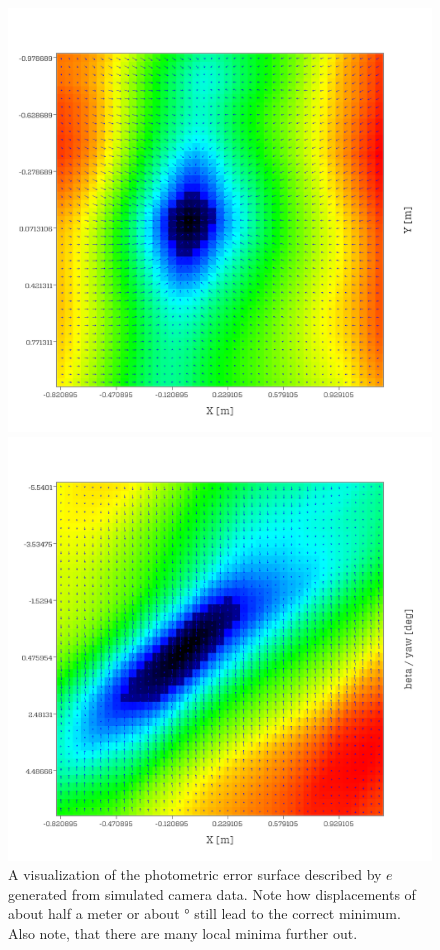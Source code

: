 \begin{figure}
\begin{minipage}[t]{0.48\textwidth}
    \end{minipage}
    \begin{minipage}[t]{0.48\textwidth}
        \includegraphics[width = \textwidth]{images/cost_surface/error_xy_1.png}
    \end{minipage}
    \hfill
    \begin{minipage}[t]{0.48\textwidth}
        \includegraphics[width = \textwidth]{images/cost_surface/error_xb_1.png}
    \end{minipage}
    \caption{A visualization of the photometric error surface described by $e$
    generated from simulated camera data. Note how displacements of about half
a meter or about \unit[5]{\degree} still lead to the correct minimum. Also
note, that there are many local minima further out.}
    \label{fig:costsurface}
\end{figure}
